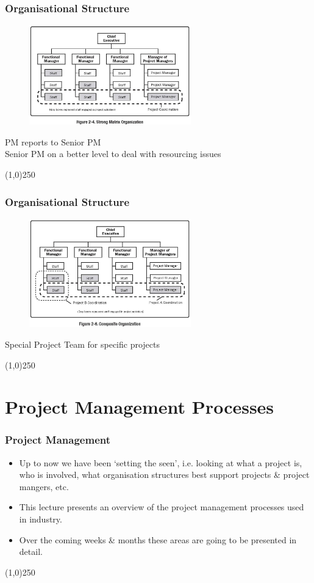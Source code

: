 \begin{frame}
\frametitle{Organisational Structure}
\begin{figure}
	\centering
		\includegraphics[width = 7cm]{images/Fig2-4.jpg}
	\label{fig:2-4}
\end{figure}PM reports to Senior PM\\
Senior PM on a better level to deal with resourcing issues\\
\end{frame}
\begin{center}\line(1,0){250}\end{center}



\begin{frame}
\frametitle{Organisational Structure}
\begin{figure}
	\centering
		\includegraphics[width = 7cm]{images/Fig2-6.jpg}
	\label{fig:2-6}
\end{figure}Special Project Team for specific projects\\
\end{frame}
\begin{center}\line(1,0){250}\end{center}


\section{Project Management Processes}


\begin{frame}
\frametitle{Project Management}
\begin{itemize}
	\item Up to now we have been `setting the seen', i.e. looking at what a project is, who is involved, what organisation structures best support projects \& project mangers, etc.
	\item This lecture presents an overview of the project management processes used in industry.  
	\item Over the coming weeks \& months these areas are going to be presented in detail.
\end{itemize}
\end{frame}
\begin{center}\line(1,0){250}\end{center}



